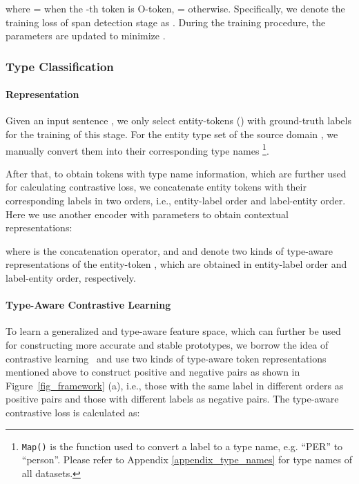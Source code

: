 \documentclass[11pt]{article}
\newcommand{\nonetoken}{\textsc{O}\xspace}
\begin{document}
\vspace{-0mm}
where = when the -th token is \nonetoken -token, = otherwise. Specifically, we denote the training loss of span detection stage as . During the training procedure, the parameters  are updated to minimize .

\subsubsection{Type Classification}
\paragraph{Representation}
Given an input sentence , we only select entity-tokens  () with ground-truth labels  for the training of this stage.
For the entity type set  of the source domain , we manually convert them into their corresponding type names \footnote{ \texttt{Map()} is the function used to convert a label to a type name, e.g. “PER” to “person”. Please refer to Appendix \ref{appendix_type_names} for type names of all datasets.}.

After that, to obtain tokens with type name information, which are further used for calculating contrastive loss, we concatenate entity tokens with their corresponding labels in two orders, i.e., entity-label order and label-entity order.
Here we use another encoder  with parameters  to obtain contextual representations:

\vspace{-0mm}

where  is the concatenation operator, and  and  denote two kinds of type-aware representations of the entity-token , which are obtained in entity-label order and label-entity order, respectively.

\paragraph{Type-Aware Contrastive Learning}
To learn a generalized and type-aware feature space, which can further be used for constructing more accurate and stable prototypes, we borrow the idea of contrastive learning~\cite{NEURIPS2020_d89a66c7_supervised_contrastive_learning} and use  two kinds of type-aware token representations mentioned above to construct positive and negative pairs as shown in Figure~\ref{fig_framework} (a), i.e., those with the same label in different orders as positive pairs and those with different labels as negative pairs.
The type-aware contrastive loss is calculated as:
\end{document}
